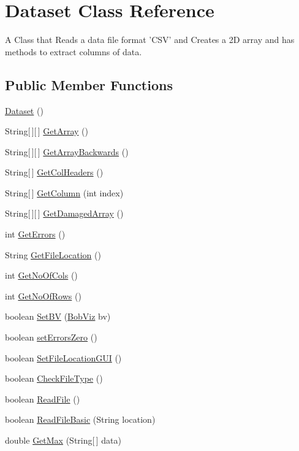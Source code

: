 \hypertarget{class_dataset}{\section{Dataset Class Reference}
\label{class_dataset}
}


A Class that Reads a data file format 'C\-S\-V' and Creates a 2\-D array and has methods to extract columns of data.  


\subsection*{Public Member Functions}
\begin{DoxyCompactItemize}
\item 
\hyperlink{class_dataset_a202d43d91e9362c7a65c677485d80509}{Dataset} ()
\item 
String\mbox{[}$\,$\mbox{]}\mbox{[}$\,$\mbox{]} \hyperlink{class_dataset_ac3f7c9a2ad9d80dcc68577aa9c5db093}{Get\-Array} ()
\item 
String\mbox{[}$\,$\mbox{]}\mbox{[}$\,$\mbox{]} \hyperlink{class_dataset_a5dee243bdd911795f92cc1db5ffe5ad3}{Get\-Array\-Backwards} ()
\item 
String\mbox{[}$\,$\mbox{]} \hyperlink{class_dataset_a96f1d135554aa77ded034853a84c4244}{Get\-Col\-Headers} ()
\item 
String\mbox{[}$\,$\mbox{]} \hyperlink{class_dataset_a7c28fdc089bb41b8ac7d5ebccb6550b6}{Get\-Column} (int index)
\item 
String\mbox{[}$\,$\mbox{]}\mbox{[}$\,$\mbox{]} \hyperlink{class_dataset_a6be8ec231fcc497e65bfb70cd149a723}{Get\-Damaged\-Array} ()
\item 
int \hyperlink{class_dataset_a4a0a7e2a2a175ca3d0cebf9431b0e3f4}{Get\-Errors} ()
\item 
String \hyperlink{class_dataset_a91fb1f2a983e9e5bef10864c0f4ec465}{Get\-File\-Location} ()
\item 
int \hyperlink{class_dataset_ab922bef50c8aa1531de8704731779246}{Get\-No\-Of\-Cols} ()
\item 
int \hyperlink{class_dataset_a91257a605317576e87e1c32e54739e51}{Get\-No\-Of\-Rows} ()
\item 
boolean \hyperlink{class_dataset_a8de6f8ac02f8378a5510f8014fb2e65f}{Set\-B\-V} (\hyperlink{class_bob_viz}{Bob\-Viz} bv)
\item 
boolean \hyperlink{class_dataset_a7848e8739ff4c596cacf2a08815f5ec5}{set\-Errors\-Zero} ()
\item 
boolean \hyperlink{class_dataset_a26dd0cb28ef8622366d67e21c38b5b0d}{Set\-File\-Location\-G\-U\-I} ()
\item 
boolean \hyperlink{class_dataset_a01147d9ebdff4ce95ed092143b4c5659}{Check\-File\-Type} ()
\item 
boolean \hyperlink{class_dataset_a54d25635d79320caa77a9d6695e5cf3d}{Read\-File} ()
\item 
boolean \hyperlink{class_dataset_abddca267426cbfcbc9a7d250ec53a5e5}{Read\-File\-Basic} (String location)
\item 
double \hyperlink{class_dataset_aea113df645c127e67f241836babeebdc}{Get\-Max} (String\mbox{[}$\,$\mbox{]} data)
\end{DoxyCompactItemize}
